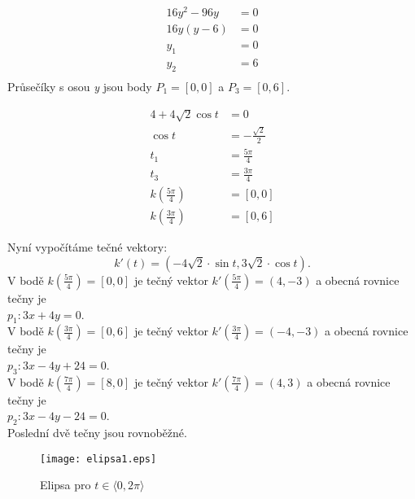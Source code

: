 \begin{enumerate}
			      \noindent\begin{minipage}[t]{0.5\textwidth}
			      \begin{align*}
			      	16y^2-96y & = 0 \\
			      	16y(y-6)  & = 0 \\
			      	y_1       & = 0 \\
			      	y_2       & = 6 \\
			      \end{align*}
			      Průsečíky s osou \textit{y} jsou body $P_1=[0,0]$ a $P_3=[0,6]$.
			\end{minipage}
			\noindent\begin{minipage}[t]{0.5\textwidth}
			\begin{align*}
				4+4\sqrt{2}\cos{t}           & = 0                   \\
				\cos{t}                      & = -\frac{\sqrt{2}}{2} \\
				t_1                          & = \frac{5\pi}{4}      \\
				t_3                          & = \frac{3\pi}{4}      \\
				k\left(\frac{5\pi}{4}\right) & = [0, 0]              \\
				k\left(\frac{3\pi}{4}\right) & = [0, 6]              
			\end{align*}
			\end{minipage}	
		\end{enumerate}
		Nyní vypočítáme tečné vektory:
		$$k'(t) = (-4\sqrt{2} \cdot \sin{t}, 3\sqrt{2} \cdot \cos{t}).$$
		V bodě $k\left(\frac{5\pi}{4}\right) = [0,0]$ je tečný vektor $k'\left(\frac{5\pi}{4}\right) = (4,-3)$
		a obecná rovnice tečny je \\ $p_1: 3x+4y=0$. \\
		V bodě $k\left(\frac{3\pi}{4}\right) = [0,6]$ je tečný vektor $k'\left(\frac{3\pi}{4}\right) = (-4,-3)$
		a obecná rovnice tečny je \\ $p_3: 3x-4y+24=0$. \\
		V bodě $k\left(\frac{7\pi}{4}\right) = [8,0]$ je tečný vektor $k'\left(\frac{7\pi}{4}\right) = (4,3)$
		a obecná rovnice tečny je \\ $p_2: 3x-4y-24=0$. \\
		Poslední dvě tečny jsou rovnoběžné.
		\vfill
		\begin{figure}[H]
			\centering
			\texttt{[image: elipsa1.eps]}
			\caption{Elipsa pro $t \in \langle0, 2\pi\rangle$}
								
		\end{figure}
		\clearpage				
